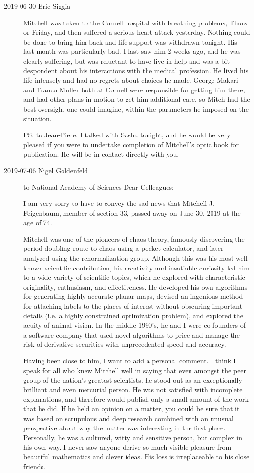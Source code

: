 \begin{description}
\item[2019-06-30 Eric Siggia]
Mitchell was taken to the Cornell hospital with breathing problems, Thurs
or Friday, and then suffered a serious heart attack yesterday. Nothing
could be done to bring him back and life support was withdrawn tonight.
His last month was particularly bad. I last saw him 2 weeks ago, and he
was clearly suffering, but was reluctant to have live in help and was a
bit despondent about his interactions with the medical profession. He
lived his life intensely and had no regrets about choices he made. George
Makari and Franco Muller both at Cornell were responsible for getting him
there, and had other plans in motion to get him additional care, so Mitch
had the best oversight one could imagine, within the parameters he
imposed on the situation.

PS: to Jean-Piere: I talked with Sasha tonight, and he would be very pleased if
you were to undertake completion of Mitchell's optic book for
publication. He will be in contact directly with you.

\item[2019-07-06 Nigel Goldenfeld]
to
National Academy of Sciences
Dear Colleagues:

I am very sorry to have to convey the sad news that Mitchell J. Feigenbaum,
member of section 33, passed away on June 30, 2019 at the age of 74.

Mitchell was one of the pioneers of chaos theory, famously discovering
the period doubling route to chaos using a pocket calculator, and later
analyzed using the renormalization group.  Although this was his most
well-known scientific contribution, his creativity and insatiable
curiosity led him to a wide variety of scientific topics, which he
explored with characteristic originality, enthusiasm, and effectiveness.
He developed his own algorithms for generating highly accurate planar
maps, devised an ingenious method for attaching labels to the places of
interest without obscuring important details (i.e. a highly constrained
optimization problem), and explored the acuity of animal vision.  In the
middle 1990's, he and I were co-founders of a software company that used
novel algorithms to price and manage the risk of derivative securities
with unprecedented speed and accuracy.

Having been close to him, I want to add a personal comment.  I think I
speak for all who knew Mitchell well in saying that even amongst the peer
group of the nation's greatest scientists, he stood out as an
exceptionally brilliant and even mercurial person.  He was not satisfied
with incomplete explanations, and therefore would publish only a small
amount of the work that he did.  If he held an opinion on a matter, you
could be sure that it was based on scrupulous and deep research combined
with an unusual perspective about why the matter was interesting in the
first place.  Personally, he was a cultured, witty and sensitive person,
but complex in his own way.  I never saw anyone derive so much visible
pleasure from beautiful mathematics and clever ideas.  His loss is
irreplaceable to his close friends.


\end{description}
